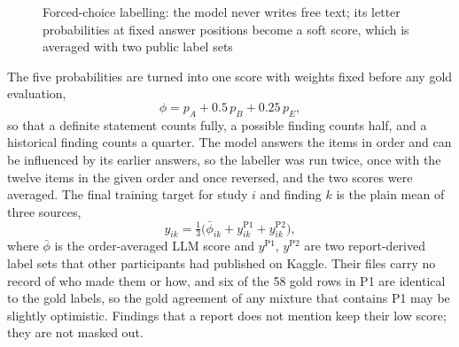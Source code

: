 \begin{figure}[htbp]
\centering{}
\caption[Forced-choice labelling pipeline]{Forced-choice labelling: the model never writes free text; its letter probabilities at fixed answer positions become a soft score, which is averaged with two public label sets}
\label{fig:labeller}
\end{figure}

The five probabilities are turned into one score with weights fixed before any gold evaluation,
\begin{equation}
\phi = p_A + 0.5\,p_B + 0.25\,p_E ,
\label{eq:s0}
\end{equation}
so that a definite statement counts fully, a possible finding counts half, and a historical finding counts a quarter. The model answers the items in order and can be influenced by its earlier answers, so the labeller was run twice, once with the twelve items in the given order and once reversed, and the two scores were averaged. The final training target for study $i$ and finding $k$ is the plain mean of three sources,
\begin{equation}
y_{ik} = \tfrac13\big(\bar\phi_{ik} + y^{\text{P1}}_{ik} + y^{\text{P2}}_{ik}\big),
\label{eq:teacher}
\end{equation}
where $\bar\phi$ is the order-averaged LLM score and $y^{\text{P1}}$, $y^{\text{P2}}$ are two report-derived label sets that other participants had published on Kaggle. Their files carry no record of who made them or how, and six of the 58 gold rows in P1 are identical to the gold labels, so the gold agreement of any mixture that contains P1 may be slightly optimistic. Findings that a report does not mention keep their low score; they are not masked out.

